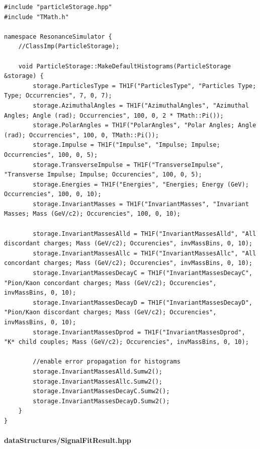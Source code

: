 \documentclass[12pt, a4paper]{article}
\begin{document}
\begin{verbatim}
#include "particleStorage.hpp"
#include "TMath.h"

namespace ResonanceSimulator {
    //ClassImp(ParticleStorage);
    
    void ParticleStorage::MakeDefaultHistograms(ParticleStorage &storage) {
        storage.ParticlesType = TH1F("ParticlesType", "Particles Type; Type; Occurrencies", 7, 0, 7);
        storage.AzimuthalAngles = TH1F("AzimuthalAngles", "Azimuthal Angles; Angle (rad); Occurrencies", 100, 0, 2 * TMath::Pi());
        storage.PolarAngles = TH1F("PolarAngles", "Polar Angles; Angle (rad); Occurrencies", 100, 0, TMath::Pi());
        storage.Impulse = TH1F("Impulse", "Impulse; Impulse; Occurrencies", 100, 0, 5);
        storage.TransverseImpulse = TH1F("TransverseImpulse", "Transverse Impulse; Impulse; Occurencies", 100, 0, 5);
        storage.Energies = TH1F("Energies", "Energies; Energy (GeV); Occurrencies", 100, 0, 10);
        storage.InvariantMasses = TH1F("InvariantMasses", "Invariant Masses; Mass (GeV/c2); Occurencies", 100, 0, 10);

        storage.InvariantMassesAlld = TH1F("InvariantMassesAlld", "All discordant charges; Mass (GeV/c2); Occurencies", invMassBins, 0, 10);
        storage.InvariantMassesAllc = TH1F("InvariantMassesAllc", "All concordant charges; Mass (GeV/c2); Occurencies", invMassBins, 0, 10);
        storage.InvariantMassesDecayC = TH1F("InvariantMassesDecayC", "Pion/Kaon concordant charges; Mass (GeV/c2); Occurencies", invMassBins, 0, 10);
        storage.InvariantMassesDecayD = TH1F("InvariantMassesDecayD", "Pion/Kaon discordant charges; Mass (GeV/c2); Occurencies", invMassBins, 0, 10);
        storage.InvariantMassesDprod = TH1F("InvariantMassesDprod", "K* child couples; Mass (GeV/c2); Occurencies", invMassBins, 0, 10);

        //enable error propagation for histograms
        storage.InvariantMassesAlld.Sumw2();
        storage.InvariantMassesAllc.Sumw2();
        storage.InvariantMassesDecayC.Sumw2();
        storage.InvariantMassesDecayD.Sumw2();
    }
}
\end{verbatim}

\paragraph{dataStructures/SignalFitResult.hpp}
\end{document}
